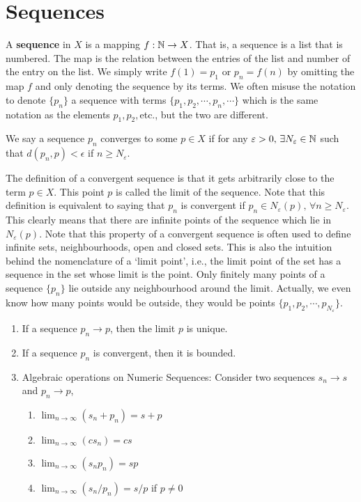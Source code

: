 \chapter{Sequences}

A \textbf{sequence} in $X$ is a mapping $f:\mathbb{N}\rightarrow X$. That is, a sequence is a list that is numbered.  The map is the relation between the entries of the list and number of the entry on the list.
We simply write $f(1)=p_1$ or $p_n=f(n)$ by omitting the map $f$ and only denoting the sequence by its terms.
We often misuse the notation to denote $\{p_n\}$ a sequence with terms $\{p_1,p_2,\cdots,p_n,\cdots\}$ which is the same notation as the elements $p_1,p_2,$etc., but the two are different.

\begin{definition}
We say a sequence $p_n$ converges to some $p\in X$ if for any $\varepsilon > 0,\,\exists N_\varepsilon\in \mathbb{N} $ such that $d(p_n,p)<\epsilon$ if $n\geq N_\varepsilon$.
\end{definition}
The definition of a convergent sequence is that it gets arbitrarily close to the term $p\in X$. This point $p$ is called the limit of the sequence. Note that this definition is equivalent to saying that $p_n$ is convergent if $p_n \in N_\varepsilon(p),\,\forall n\geq N_\varepsilon$. This clearly means that there are infinite points of the sequence which lie in $N_\varepsilon (p)$. Note that this property of a convergent sequence is often used to define infinite sets, neighbourhoods, open and closed sets. This is also the intuition behind the nomenclature of a `limit point', i.e., the limit point of the set has a sequence in the set whose limit is the point. 
Only finitely many points of a sequence $\{p_n\}$ lie outside any neighbourhood around the limit. Actually, we even know how many points would be outside, they would be points $\{p_1,p_2,\cdots,p_{N_\varepsilon}\}$.

\begin{remark}
\begin{enumerate}[label=R\arabic*.]
\item If a sequence $p_n\rightarrow p$, then the limit $p$ is unique.
\item If a sequence $p_n$ is convergent, then it is bounded.
\item Algebraic operations on Numeric Sequences: Consider two sequences $s_n\to s$ and $p_n\to p$,
\begin{enumerate}[label=R.2.\alph*]
    \item $\lim_{n\to\infty}(s_n+p_n) = s + p$
    \item $\lim_{n\to\infty}(cs_n) = cs$
    \item $\lim_{n\to\infty}(s_np_n) = sp$
    \item $\lim_{n\to\infty}(s_n/p_n) = s/p$ if $p\neq0$
\end{enumerate}
\end{enumerate}
\end{remark}

